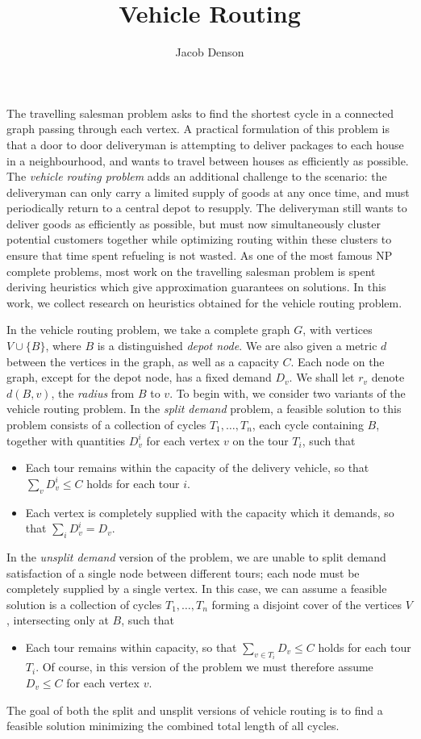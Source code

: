 \documentclass{article}
\title{Vehicle Routing}
\author{Jacob Denson}
\theoremstyle{plain}
\theoremstyle{plain}
\begin{document}
\maketitle

The travelling salesman problem asks to find the shortest cycle in a connected graph passing through each vertex. A practical formulation of this problem is that a door to door deliveryman is attempting to deliver packages to each house in a neighbourhood, and wants to travel between houses as efficiently as possible. The {\it vehicle routing problem} adds an additional challenge to the scenario: the deliveryman can only carry a limited supply of goods at any once time, and must periodically return to a central depot to resupply. The deliveryman still wants to deliver goods as efficiently as possible, but must now simultaneously cluster potential customers together while optimizing routing within these clusters to ensure that time spent refueling is not wasted. As one of the most famous NP complete problems, most work on the travelling salesman problem is spent deriving heuristics which give approximation guarantees on solutions. In this work, we collect research on heuristics obtained for the vehicle routing problem.

In the vehicle routing problem, we take a complete graph $G$, with vertices $V \cup \{ B \}$, where $B$ is a distinguished {\it depot node}. We are also given a metric $d$ between the vertices in the graph, as well as a capacity $C$. Each node on the graph, except for the depot node, has a fixed demand $D_v$. We shall let $r_v$ denote $d(B,v)$, the {\it radius} from $B$ to $v$. To begin with, we consider two variants of the vehicle routing problem. In the {\it split demand} problem, a feasible solution to this problem consists of a collection of cycles $T_1, \dots, T_n$, each cycle containing $B$, together with quantities $D^i_v$ for each vertex $v$ on the tour $T_i$, such that
%
\begin{itemize}
    \item Each tour remains within the capacity of the delivery vehicle, so that $\sum_v D^i_v \leq C$ holds for each tour $i$.

    \item Each vertex is completely supplied with the capacity which it demands, so that $\sum_i D^i_v = D_v$.
\end{itemize}
%
In the {\it unsplit demand} version of the problem, we are unable to split demand satisfaction of a single node between different tours; each node must be completely supplied by a single vertex. In this case, we can assume a feasible solution is a collection of cycles $T_1, \dots, T_n$ forming a disjoint cover of the vertices $V$, intersecting only at $B$, such that
%
\begin{itemize}
    \item Each tour remains within capacity, so that $\sum_{v \in T_i} D_v \leq C$ holds for each tour $T_i$. Of course, in this version of the problem we must therefore assume $D_v \leq C$ for each vertex $v$.
\end{itemize}
%
The goal of both the split and unsplit versions of vehicle routing is to find a feasible solution minimizing the combined total length of all cycles.
\end{document}
